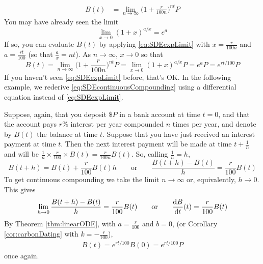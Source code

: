\begin{align*}
B(t) &= \lim_{n\rightarrow\infty} \Big(1+\frac{r}{100n}\Big)^{nt}P
\end{align*}
You may have already seen the limit
\begin{equation}\label{eq:SDEexpLimit}
\lim_{x\rightarrow 0}(1+x)^{a/x}=e^a
\end{equation}
If so, you can evaluate $B(t)$ by applying \eqref{eq:SDEexpLimit}
with $x=\frac{r}{100n}$ and $a=\frac{rt}{100}$ (so that $\frac{a}{x}=nt$).
As $n\rightarrow \infty$, $x\rightarrow 0$ so that
\begin{equation}\label{eq:SDEcontinuousCompounding}
B(t) = \lim_{n\rightarrow\infty} \Big(1+\frac{r}{100n}\Big)^{nt}P
     =\lim_{x\rightarrow 0}(1+x)^{a/x}P=e^aP
     = e^{rt/100}P
\end{equation}
If you haven't seen \eqref{eq:SDEexpLimit} before, that's OK.
In the following example, we rederive \eqref{eq:SDEcontinuousCompounding}
using a differential equation instead of \eqref{eq:SDEexpLimit}.
\begin{eg}\label{eg:SDEmoneyA}
Suppose, again, that you deposit $\$P$ in a bank
account at time $t=0$, and that the account pays $r\%$ interest per year
compounded $n$ times per year, and denote by $B(t)$ the balance at time
$t$. Suppose that you have just received an interest payment at time $t$.
Then the next interest payment will be made at time $t+\frac{1}{n}$
and will be $\frac{1}{n}\times\frac{r}{100}\times B(t)=\frac{r}{100n}B(t)$.
So, calling $\frac{1}{n}=h$,
\begin{equation*}
B(t+h)=B(t) + \frac{r}{100}B(t)h\qquad\text{or}\qquad
\frac{B(t+h)-B(t)}{h} = \frac{r}{100}B(t)
\end{equation*}
To get continuous compounding we take the limit $n\rightarrow\infty$
or, equivalently, $h\rightarrow 0$. This gives
\begin{equation*}
\lim_{h\rightarrow 0}\frac{B(t+h)-B(t)}{h} = \frac{r}{100}B(t)
\qquad\text{or}\qquad
\diff{B}{t}(t) = \frac{r}{100}B(t)
\end{equation*}
By Theorem \ref{thm:linearODE}, with $a=\frac{r}{100}$ and $b=0$,
(or Corollary \ref{cor:carbonDating} with $k=-\frac{r}{100}$),
\begin{align*}
B(t)=e^{rt/100}B(0)=e^{rt/100}P
\end{align*}
once again.
\end{eg}
\goodbreak
